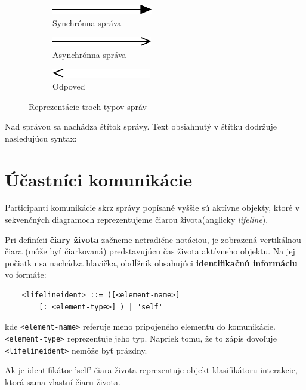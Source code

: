 \begin{figure}[H]
	\centering
	\begin{subfigure}[t]{.3\textwidth}
		\centering
		\includegraphics{obrazky-figures/SD-sync}
		\caption{Synchrónna správa}
	\end{subfigure}
	\begin{subfigure}[t]{.3\textwidth}
		\centering
		\includegraphics{obrazky-figures/SD-async}
		\caption{Asynchrónna správa}
	\end{subfigure}
\begin{subfigure}[t]{.3\textwidth}
	\centering
	\includegraphics{obrazky-figures/SD-reply}
	\caption{Odpoveď}
\end{subfigure}
	\caption{Reprezentácie troch typov správ}
	\label{fig:arrows}
\end{figure}

Nad správou sa nachádza štítok správy. Text obsiahnutý v štítku dodržuje nasledujúcu syntax:



\section{Účastníci komunikácie}
Participanti komunikácie skrz správy popísané vyššie sú aktívne objekty, ktoré v sekvenčných diagramoch reprezentujeme čiarou života(anglicky \emph{lifeline}).

\begin{defn}
	Pri definícii \textbf{čiary života} začneme netradične notáciou, je zobrazená vertikálnou čiara (môže byť čiarkovaná) predstavujúcu čas života aktívneho objektu. Na jej počiatku sa nachádza hlavička, obdĺžnik obsahujúci \textbf{identifikačnú informáciu} vo formáte: \\
	\begin{lstlisting}
	<lifelineident> ::= ([<element-name>]
		[: <element-type>] ) | 'self'
	\end{lstlisting} \vspace{.5cm}
	
	kde \lstinline{<element-name>} referuje meno pripojeného elementu do komunikácie. \lstinline{<element-type>} reprezentuje jeho typ. Napriek tomu, že to zápis dovoľuje \lstinline{<lifelineident>} nemôže byť prázdny.
	
	Ak je identifikátor 'self' čiara života reprezentuje objekt klasifikátoru interakcie, ktorá sama vlastní čiaru života.
	
	
\end{defn} 

